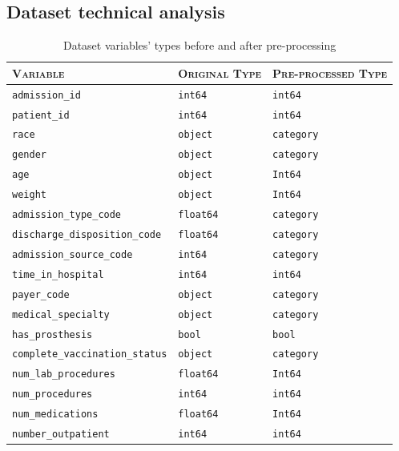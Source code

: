 \documentclass[a4paper,11pt]{article}
\newcommand{\admissionId}{\texttt{admission\_id}\xspace}
\newcommand{\patientId}{\texttt{patient\_id}\xspace}
\newcommand{\race}{\texttt{race}\xspace}
\newcommand{\gender}{\texttt{gender}\xspace}
\newcommand{\age}{\texttt{age}\xspace}
\newcommand{\weight}{\texttt{weight}\xspace}
\newcommand{\admissionTypeCode}{\texttt{admission\_type\_code}\xspace}
\newcommand{\dischargeDispositionCode}{\texttt{discharge\_disposition\_code}\xspace}
\newcommand{\admissionSourceCode}{\texttt{admission\_source\_code}\xspace}
\newcommand{\timeInHospital}{\texttt{time\_in\_hospital}\xspace}
\newcommand{\payerCode}{\texttt{payer\_code}\xspace}
\newcommand{\medicalSpecialty}{\texttt{medical\_specialty}\xspace}
\newcommand{\hasProsthesis}{\texttt{has\_prosthesis}\xspace}
\newcommand{\completeVaccinationStatus}{\texttt{complete\_vaccination\_status}\xspace}
\newcommand{\numLabProcedures}{\texttt{num\_lab\_procedures}\xspace}
\newcommand{\numProcedures}{\texttt{num\_procedures}\xspace}
\newcommand{\numMedications}{\texttt{num\_medications}\xspace}
\newcommand{\numberOutpatient}{\texttt{number\_outpatient}\xspace}
\begin{document}
\subsection{Dataset technical analysis}
\label{subsection:tech_analysis}

\begin{table}[H]
\caption{Dataset variables' types before and after pre-processing }
\label{tab:dtypes}
\centering
\begin{tabularx}{1\textwidth}{XYY}
\toprule
\textsc{Variable} &        \textsc{Original Type} & \textsc{Pre-processed Type}\\
\midrule
\admissionId                &    \texttt{int64} &     \texttt{int64} \\
\patientId                  &    \texttt{int64} &     \texttt{int64} \\
\race                        &   \texttt{object} &  \texttt{category} \\
\gender                      &   \texttt{object} &  \texttt{category} \\
\age                         &   \texttt{object} &     \texttt{Int64} \\
\weight                      &   \texttt{object} &     \texttt{Int64} \\
\admissionTypeCode         &  \texttt{float64} &  \texttt{category} \\
\dischargeDispositionCode  &  \texttt{float64} &  \texttt{category} \\
\admissionSourceCode       &    \texttt{int64} &  \texttt{category} \\
\timeInHospital            &    \texttt{int64} &     \texttt{int64} \\
\payerCode                  &   \texttt{object} &  \texttt{category} \\
\medicalSpecialty           &   \texttt{object} &  \texttt{category} \\
\hasProsthesis              &     \texttt{bool} &      \texttt{bool} \\
\completeVaccinationStatus &   \texttt{object} &  \texttt{category} \\
\numLabProcedures          &  \texttt{float64} &     \texttt{Int64} \\
\numProcedures              &    \texttt{int64} &     \texttt{int64} \\
\numMedications             &  \texttt{float64} &     \texttt{Int64} \\
\numberOutpatient           &    \texttt{int64} &     \texttt{int64} \\

\end{tabularx}
\end{table}
\end{document}
